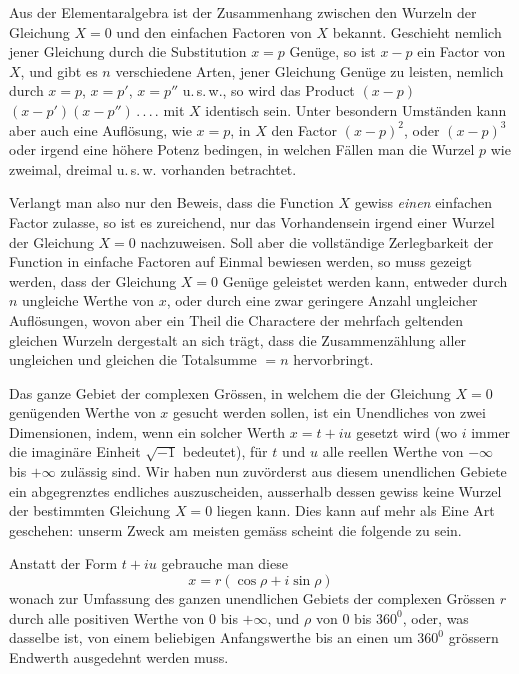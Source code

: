 \par
{}
Aus der Elementaralgebra ist der Zusammenhang zwischen den Wurzeln der Gleichung $X=0$ und den einfachen Factoren von $X$ bekannt. Geschieht nemlich
jener Gleichung durch die Substitution $x=p$ Genüge, so ist $x-p$ ein Factor
von $X$, und gibt es $n$ verschiedene Arten, jener Gleichung Genüge zu leisten,
nemlich durch $x=p$, $x=p'$, $x=p''$ u.\,s.\,w., so wird das Product $(x-p)$
$(x-p')(x-p'')\, .\, .\, .\, .$ mit $X$ identisch sein. Unter besondern Umständen kann
aber auch eine Auflösung, wie $x=p$, in $X$ den Factor $(x-p)^2$, oder $(x-p)^3$
oder irgend eine höhere Potenz bedingen, in welchen Fällen man die Wurzel $p$
wie zweimal, dreimal u.\,s.\,w. vorhanden betrachtet.

Verlangt man also nur den Beweis, dass die Function $X$ gewiss \textit{einen} einfachen Factor zulasse, so ist es zureichend, nur das Vorhandensein irgend einer
Wurzel der Gleichung $X=0$ nachzuweisen. Soll aber die vollständige Zerlegbarkeit der Function in einfache Factoren auf Einmal bewiesen werden, so muss
gezeigt werden, dass der Gleichung $X=0$ Genüge geleistet werden kann, entweder durch $n$ ungleiche Werthe von $x$, oder durch eine zwar geringere Anzahl
ungleicher Auflösungen, wovon aber ein Theil die Charactere der mehrfach geltenden gleichen Wurzeln dergestalt an sich trägt, dass die Zusammenzählung aller ungleichen und gleichen die Totalsumme $=n$ hervorbringt.

Das ganze Gebiet der complexen Grössen, in welchem die der Gleichung
$X=0$ genügenden Werthe von $x$ gesucht werden sollen, ist ein Unendliches
von zwei Dimensionen, indem, wenn ein solcher Werth $x=t+iu$ gesetzt wird
(wo $i$ immer die imaginäre Einheit $\surd{-1}$ bedeutet), für $t$ und $u$ alle reellen
Werthe von $-\infty$ bis $+\infty$ zulässig sind. Wir haben nun zuvörderst aus diesem unendlichen Gebiete ein abgegrenztes endliches auszuscheiden, ausserhalb
dessen gewiss keine Wurzel der bestimmten Gleichung $X=0$ liegen kann.
Dies kann auf mehr als Eine Art geschehen: unserm Zweck am meisten gemäss
scheint die folgende zu sein.

Anstatt der Form $t+iu$ gebrauche man diese
\[
x=r(\cos\rho+i\sin\rho)
\]
wonach zur Umfassung des ganzen unendlichen Gebiets der complexen Grössen
$r$ durch alle positiven Werthe von $0$ bis $+\infty$, und $\rho$ von $0$ bis $360^0$, oder, was
dasselbe ist, von einem beliebigen Anfangswerthe bis an einen um $360^0$ grössern
Endwerth ausgedehnt werden muss.

